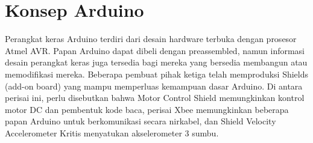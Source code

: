 \section{Konsep Arduino}
	Perangkat keras Arduino terdiri dari desain hardware terbuka dengan prosesor Atmel AVR. Papan Arduino dapat dibeli dengan preassembled, namun informasi desain perangkat keras juga tersedia bagi mereka yang bersedia membangun atau memodifikasi mereka. Beberapa pembuat pihak ketiga telah memproduksi Shields (add-on board) yang mampu memperluas kemampuan dasar Arduino. Di antara perisai ini, perlu disebutkan bahwa Motor Control Shield memungkinkan kontrol motor DC dan pembentuk kode baca, perisai Xbee memungkinkan beberapa papan Arduino untuk berkomunikasi secara nirkabel, dan Shield Velocity Accelerometer Kritis menyatukan akselerometer 3 sumbu.